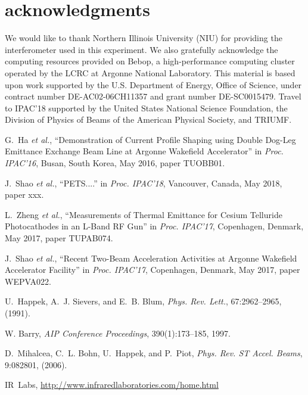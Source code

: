 \documentclass[letterpaper,  %
              ]{jacow-2_3}   %
\begin{document}
\section{acknowledgments}
We would like to thank 
Northern Illinois University (NIU) for providing the 
interferometer used in this experiment. 
We also gratefully acknowledge the computing resources
provided on Bebop, a high-performance computing cluster
operated by the LCRC at Argonne National Laboratory.
This material is based upon work supported by the 
U.S. Department of Energy, Office of Science, under 
contract number DE-AC02-06CH11357 and grant number DE-SC0015479. 
Travel to IPAC'18 supported by the United States National Science Foundation, 
the Division of Physics of Beams of the American Physical Society, and TRIUMF.


\begin{thebibliography}{99}
G.~Ha \emph{et al.}, “Demonstration of Current Profile 
Shaping using Double Dog-Leg Emittance Exchange Beam 
Line at Argonne Wakefield Accelerator”
in \textit{Proc. IPAC’16}, 
Busan, South Korea, May 2016, 
paper TUOBB01.

J.~Shao \emph{et al.}, “PETS....”
in \textit{Proc. IPAC’18}, 
Vancouver, Canada, May 2018, 
paper xxx.

L.~Zheng \emph{et al.}, “Measurements of Thermal Emittance 
for Cesium Telluride Photocathodes in an L-Band RF Gun”
in \textit{Proc. IPAC’17}, 
Copenhagen, Denmark, May 2017, 
paper TUPAB074.

J.~Shao \emph{et al.}, “Recent Two-Beam 
Acceleration Activities at Argonne Wakefield Accelerator Facility”
in \textit{Proc. IPAC’17}, 
Copenhagen, Denmark, May 2017, 
paper WEPVA022.

U.~Happek, A.~J. Sievers, and E.~B. Blum,
\emph{Phys. Rev. Lett.}, 67:2962--2965, (1991).

W. Barry,
\emph{AIP Conference Proceedings}, 390(1):173--185, 1997.

D.~Mihalcea, C.~L. Bohn, U.~Happek, and P.~Piot,
\newblock \emph{Phys. Rev. ST Accel. Beams}, 9:082801, (2006).

IR~Labs,
\newblock \url{http://www.infraredlaboratories.com/home.html}


\end{thebibliography}
\end{document}
